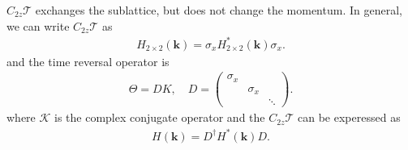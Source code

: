 \documentclass[10pt, oneside]{article}
\newcommand{\p}[1]{\left(#1\right)}
\begin{document}
\(C_{2z} \mathcal{T} \) exchanges the sublattice, but does not change the momentum. In general, we can write \(C_{2z} \mathcal{T} \) as
\begin{align}
	H_{2 \times 2} \p{\bm{k}}= \sigma_{x} H^{*}_{2 \times 2}  \p{\bm{k}} \sigma_{x}. 
\end{align}
and the time reversal operator is
\begin{align}
	\Theta = D K, \quad D =\begin{pmatrix}
		\sigma_{x} & &   \\
		& \sigma_{x} &  \\
		& & \ddots
	\end{pmatrix}.
\end{align}
where \(\mathcal{K}\) is the complex conjugate operator and the \(C_{2z} \mathcal{T} \) can be experessed as 
\begin{align}
	H \p{\bm{k}} = D^\dagger H^{*} \p{\bm{k}} D.
\end{align}
\end{document}
